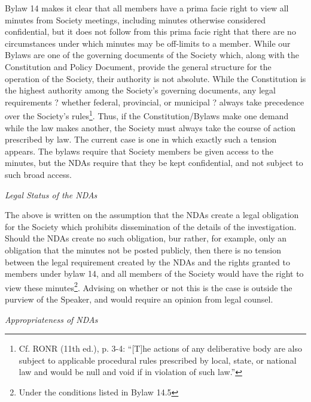 \begin{multicols}{2}
\begin{longenum}[ label*=\arabic*., align=left]
\begin{longenum}
Bylaw 14 makes it clear that all members have a prima facie right to view all minutes from Society meetings, including minutes otherwise considered confidential, but it does not follow from this prima facie right that there are no circumstances under which minutes may be off-limits to a member.
While our Bylaws are one of the governing documents of the Society which, along with the Constitution and Policy Document, provide the general structure for the operation of the Society, their authority is not absolute. While the Constitution is the highest authority among the Society's governing documents, any legal requirements ? whether federal, provincial, or municipal ? always take precedence over the Society's rules\footnote{Cf. RONR (11th ed.), p. 3-4: ``[T]he actions of any deliberative body are also subject to applicable procedural rules prescribed by local, state, or national law and would be null and void if in violation of such law.''}.  Thus, if the Constitution/Bylaws make one demand while the law makes another, the Society must always take the course of action prescribed by law.
The current case is one in which exactly such a tension appears. The bylaws require that Society members be given access to the minutes, but the NDAs require that they be kept confidential, and not subject to such broad access.

\item \textit{Legal Status of the NDAs}

 The above is written on the assumption that the NDAs create a legal obligation for the Society which prohibits dissemination of the details of the investigation. Should the NDAs create no such obligation, bur rather, for example, only an obligation that the minutes not be posted publicly, then there is no tension between the legal requirement created by the NDAs and the rights granted to members under bylaw 14, and all members of the Society would have the right to view these minutes\footnote{Under the conditions listed in Bylaw 14.5}.  Advising on whether or not this is the case is outside the purview of the Speaker, and would require an opinion from legal counsel.
 
\item \textit{Appropriateness of NDAs}


\end{longenum}
\end{longenum}
\end{multicols}
